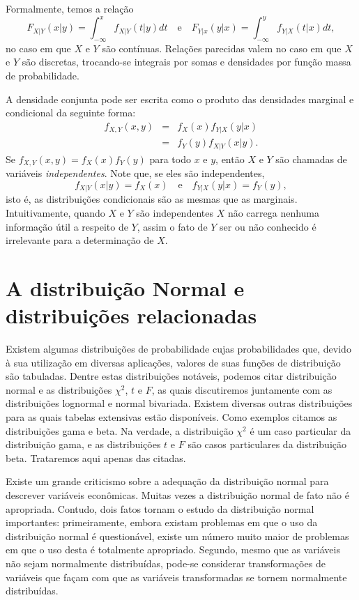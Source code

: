 \documentclass[
]{book}
\theoremstyle{definition}
\theoremstyle{definition}
\theoremstyle{definition}
\theoremstyle{remark}
\begin{document}
Formalmente, temos a relação
\[F_{X|Y}(x|y)=\int_{-\infty}^xf_{X|Y}(t|y)dt\quad \mbox{e} \quad F_{Y|x}(y|x)=\int_{-\infty}^yf_{Y|X}(t|x)dt,\]
no caso em que \(X\) e \(Y\) são contínuas. Relações parecidas valem no caso em que \(X\) e \(Y\) são discretas, trocando-se integrais por somas e densidades por função massa de probabilidade.

A densidade conjunta pode ser escrita como o produto das
densidades marginal e condicional da seguinte forma:
\begin{eqnarray*}
f_{X,Y}(x,y)&=&f_X(x)f_{Y|X}(y|x)\\
      &=&f_Y(y)f_{X|Y}(x|y).
\end{eqnarray*}
Se \(f_{X,Y}(x,y)=f_X(x)f_Y(y)\) para todo \(x\) e \(y\), então \(X\) e \(Y\) são
chamadas de variáveis \emph{independentes}. Note que, se eles são
independentes,
\[f_{X|Y}(x|y)=f_X(x) \quad \mbox{e} \quad f_{Y|X}(y|x)=f_Y(y),\]
isto é, as distribuições condicionais são as mesmas que as marginais. Intuitivamente, quando \(X\) e \(Y\) são independentes \(X\) não carrega nenhuma informação útil a respeito de \(Y\), assim o fato de \(Y\) ser ou não conhecido é irrelevante para a determinação de \(X\).

\hypertarget{a-distribuiuxe7uxe3o-normal-e-distribuiuxe7uxf5es-relacionadas}{%
\section{A distribuição Normal e distribuições relacionadas}\label{a-distribuiuxe7uxe3o-normal-e-distribuiuxe7uxf5es-relacionadas}}

Existem algumas distribuições de probabilidade cujas probabilidades que, devido à sua utilização em diversas aplicações, valores de suas funções de distribuição são tabuladas. Dentre estas distribuições notáveis, podemos citar distribuição normal e as distribuições \(\chi^2\), \(t\) e \(F\), as quais discutiremos juntamente com as distribuições lognormal e normal bivariada. Existem diversas outras distribuições para as quais tabelas extensivas estão disponíveis. Como exemplos citamos as distribuições gama e beta. Na verdade, a distribuição \(\chi^2\) é um caso particular da distribuição gama, e as distribuições \(t\) e \(F\) são casos particulares da distribuição beta. Trataremos aqui apenas das citadas.

Existe um grande criticismo sobre a adequação da distribuição normal para descrever variáveis econômicas. Muitas vezes a distribuição normal de fato não é apropriada. Contudo, dois fatos tornam o estudo da distribuição normal importantes: primeiramente, embora existam problemas em que o uso da distribuição normal é questionável, existe um número muito maior de problemas em que o uso desta é totalmente apropriado. Segundo, mesmo que as variáveis não sejam normalmente distribuídas, pode-se considerar transformações de variáveis que façam com que as variáveis transformadas se tornem normalmente distribuídas.
\end{document}

